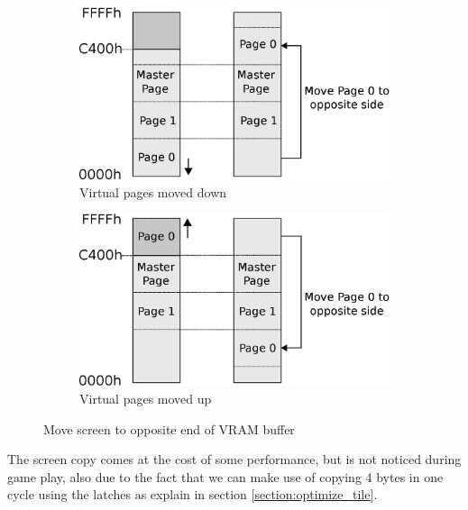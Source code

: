 \documentclass[book.tex]{subfiles}
\begin{document}
\begin{figure}[H]
\centering
\begin{subfigure}{.5\textwidth}
  \centering
  \includegraphics[width=.9\textwidth]{imgs/drawings/Page_down_switch.eps}
  \caption{Virtual pages moved down}
  \label{fig:page0_down}
\end{subfigure}%
\begin{subfigure}{.5\textwidth}
  \centering
  \includegraphics[width=.9\textwidth]{imgs/drawings/Page_up_switch.eps}
    \caption{Virtual pages moved up}
  \label{fig:page0_up}
\end{subfigure}
\caption{Move screen to opposite end of VRAM buffer}
\label{fig:page_wrapping}
\end{figure}
\par
The screen copy comes at the cost of some performance, but is not noticed during game play, also due to the fact that we can make use of copying 4 bytes in one cycle using the latches as explain in section \ref{section:optimize_tile}.\\
\par
\begin{minipage}{\textwidth}
  
  \end{minipage}
  \label{ega_refresh}
  \par
\end{document}
